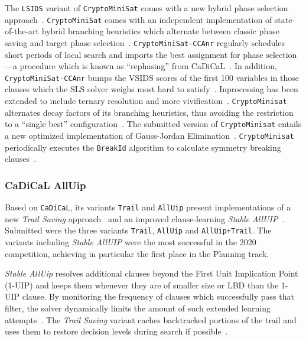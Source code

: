 \documentclass{elsarticle}
\newcommand{\solver}[1]{\texttt{#1}}
\begin{document}
The \solver{LSIDS} variant of \solver{CryptoMiniSat} comes with a new hybrid phase selection approach~\cite{Shaw:2020:LSIDS,Soos:SC2020}.
\solver{CryptoMiniSat} comes with an independent implementation of state-of-the-art hybrid branching heuristics which alternate between classic phase saving and target phase selection~\cite{Biere:SC2019}.
\solver{CryptoMiniSat-CCAnr} regularly schedules short periods of local search and imports the best assignment for phase selection---a procedure which is known as ``rephasing'' from CaDiCaL~\cite{Biere:SC2019}.
In addition, \solver{CryptoMiniSat-CCAnr} bumps the VSIDS scores of the first 100 variables in those clauses which the SLS solver weighs most hard to satisfy~\cite{Soos:SC2020}.
Inprocessing has been extended to include ternary resolution and more vivification~\cite{ChuMinLi:2020:Vivification}. 
\solver{CryptoMinisat} alternates decay factors of its branching heuristics, thus avoiding the restriction to a ``single best'' configuration~\cite{Soos:SC2020}. 
The submitted version of \solver{CryptoMinisat} entails a new optimized implementation of Gauss-Jordan Elimination~\cite{Soos:2020:CNFXOR}. 
\solver{CryptoMinisat} periodically executes the \solver{BreakId} algorithm to  calculate symmetry breaking clauses~\cite{Devriendt:2016:BreakId}.


\subsubsection{CaDiCaL AllUip}

Based on \solver{CaDiCaL}, its variants \solver{Trail} and \solver{AllUip} present implementations of a new \emph{Trail Saving} approach~\cite{Hickey:2020:TrailSaving} 
and an improved clause-learning \emph{Stable AllUIP}~\cite{Bacchus:SC2020}. 
Submitted were the three variants \solver{Trail}, \solver{AllUip} and \solver{AllUip+Trail}. 
The variants including \emph{Stable AllUIP} were the most successful in the 2020 competition, achieving in particular the  first place in the Planning track. 

\emph{Stable AllUip} resolves additional clauses beyond the First Unit Implication Point (1-UIP) and keeps them whenever they are of smaller size or LBD than the 1-UIP clause. 
By monitoring the frequency of clauses which successfully pass that filter, the solver dynamically limits the amount of such extended learning attempts~\cite{Zhang:2001:ClauseLearning,Bacchus:SC2020}.
The \emph{Trail Saving} variant caches backtracked portions of the trail and uses them to restore decision levels during search if possible~\cite{Hickey:2020:TrailSaving}. 
\end{document}
